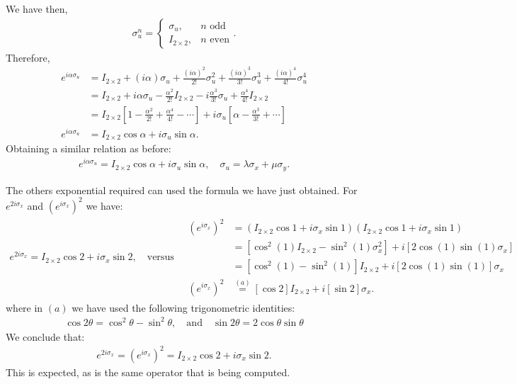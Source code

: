 \documentclass[letterpaper,11pt,twoside]{article}
\begin{document}
We have then,
\begin{align*}
  \sigma_u^n=\begin{cases}
    \sigma_u,&\text{$n$ odd}\\
    I_{2\times2},&\text{$n$ even}
  \end{cases}.
\end{align*}
Therefore,
\begin{align*}
  e^{i\alpha\sigma_u}&=I_{2\times2}+(i\alpha)\sigma_u+\frac{(i\alpha)^2}{2!}\sigma_u^2+\frac{(i\alpha)^3}{3!}\sigma_u^3+\frac{(i\alpha)^4}{4!}\sigma_u^4\\
  &=I_{2\times2}+i\alpha\sigma_u-\frac{\alpha^2}{2!}I_{2\times2}-i\frac{\alpha^3}{3!}\sigma_u+\frac{\alpha^4}{4!}I_{2\times2}\\
  &=I_{2\times2}\left[1-\frac{\alpha^2}{2!}+\frac{\alpha^4}{4!}-\cdots\right]+i\sigma_u\left[\alpha-\frac{\alpha^3}{3!}+\cdots\right]\\
  e^{i\alpha\sigma_u}&=I_{2\times2}\cos\alpha+i\sigma_u\sin\alpha.
\end{align*}
Obtaining a similar relation as before:
\begin{align}
  e^{i\alpha\sigma_u}=I_{2\times2}\cos\alpha+i\sigma_u\sin\alpha,\quad\sigma_u=\lambda\sigma_x+\mu\sigma_y.
  \label{eq:formula}
\end{align}

The others exponential required can used the formula we have just obtained. 
For $e^{2i\sigma_x}$ and $(e^{i\sigma_x})^2$ we have:
\begin{align*}
  e^{2i\sigma_x}=I_{2\times2}\cos2+i\sigma_x\sin2,\quad\text{versus}\quad
  \begin{array}{rl}
    (e^{i\sigma_x})^2&=(I_{2\times2}\cos1+i\sigma_x\sin1)(I_{2\times2}\cos1+i\sigma_x\sin1)\\
    &=[\cos^2(1)I_{2\times2}-\sin^2(1)\sigma^2_x]+i[2\cos(1)\sin(1)\sigma_x]\\
    &=[\cos^2(1)-\sin^2(1)]I_{2\times2}+i[2\cos(1)\sin(1)]\sigma_x\\
    (e^{i\sigma_x})^2&\stackrel{(a)}{=}[\cos2]I_{2\times2}+i[\sin2]\sigma_x.
  \end{array}
\end{align*}
where in $(a)$ we have used the following trigonometric identities:
\begin{align*}
  \cos2\theta=\cos^2\theta-\sin^2\theta,\quad\text{and}\quad\sin2\theta=2\cos\theta\sin\theta
\end{align*}
We conclude that:
\begin{align}
  e^{2i\sigma_x}=(e^{i\sigma_x})^2=I_{2\times2}\cos2+i\sigma_x\sin2.
\end{align}
This is expected, as is the same operator that is being computed.
\end{document}
